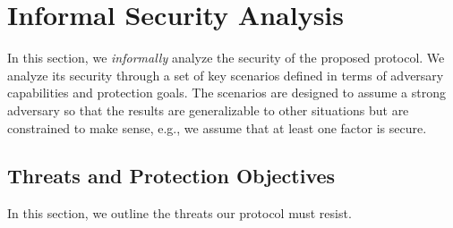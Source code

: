 
\section{Informal Security Analysis}
\label{sec:security}

In this section, we \textit{informally} analyze the security of the proposed protocol. We analyze its security through a set of key scenarios defined in terms of adversary capabilities and protection goals.
The scenarios are designed to assume a strong adversary so that the results are generalizable to other situations but are constrained to make sense, e.g., we assume that at least one factor is secure.


\subsection{Threats and Protection Objectives}

In this section, we outline the threats our protocol must resist. 



